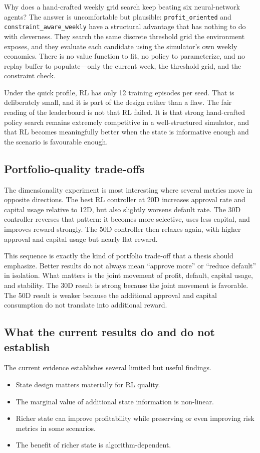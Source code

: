 \documentclass[12pt,a4paper]{article}
\begin{document}
Why does a hand-crafted weekly grid search keep beating six neural-network agents? The answer is uncomfortable but plausible: \texttt{profit\_oriented} and \texttt{constraint\_aware\_weekly} have a structural advantage that has nothing to do with cleverness. They search the same discrete threshold grid the environment exposes, and they evaluate each candidate using the simulator's own weekly economics. There is no value function to fit, no policy to parameterize, and no replay buffer to populate---only the current week, the threshold grid, and the constraint check.

Under the quick profile, RL has only 12 training episodes per seed. That is deliberately small, and it is part of the design rather than a flaw. The fair reading of the leaderboard is not that RL failed. It is that strong hand-crafted policy search remains extremely competitive in a well-structured simulator, and that RL becomes meaningfully better when the state is informative enough and the scenario is favourable enough.

\subsection{Portfolio-quality trade-offs}

The dimensionality experiment is most interesting where several metrics move in opposite directions. The best RL controller at 20D increases approval rate and capital usage relative to 12D, but also slightly worsens default rate. The 30D controller reverses that pattern: it becomes more selective, uses less capital, and improves reward strongly. The 50D controller then relaxes again, with higher approval and capital usage but nearly flat reward.

This sequence is exactly the kind of portfolio trade-off that a thesis should emphasize. Better results do not always mean ``approve more'' or ``reduce default'' in isolation. What matters is the joint movement of profit, default, capital usage, and stability. The 30D result is strong because the joint movement is favorable. The 50D result is weaker because the additional approval and capital consumption do not translate into additional reward.

\subsection{What the current results do and do not establish}

The current evidence establishes several limited but useful findings.
\begin{itemize}[leftmargin=*]
    \item State design matters materially for RL quality.
    \item The marginal value of additional state information is non-linear.
    \item Richer state can improve profitability while preserving or even improving risk metrics in some scenarios.
    \item The benefit of richer state is algorithm-dependent.
\end{itemize}
\end{document}
